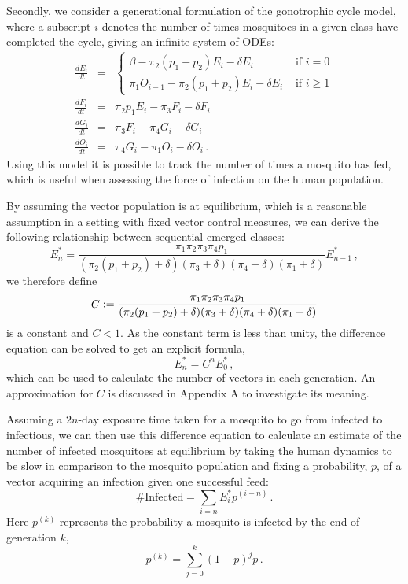 \documentclass[5p,times]{elsarticle}
\newcommand{\defeq}{\vcentcolon=}
\begin{document}
Secondly, we consider a generational formulation of the gonotrophic cycle model, where a subscript $i$ denotes the number of times mosquitoes in a given class have completed the cycle, giving an infinite system of ODEs:
\begin{eqnarray}
\frac{dE_i}{dt} &=& \begin{cases}  \beta - \pi_2(p_1+p_2)E_{i} -\delta E_{i} &\mbox{ if } i=0\\ \pi_1O_{i-1} - \pi_2(p_1+p_2)E_{i} -\delta E_{i} &\mbox{ if } i\geq 1
\end{cases}\\
\frac{dF_i}{dt} &=& \pi_2p_1E_i - \pi_3 F_i - \delta F_i \\
\frac{dG_i}{dt} &=& \pi_3F_i - \pi_4G_i - \delta G_i \\
\frac{dO_i}{dt} &=& \pi_4G_i - \pi_1O_i - \delta O_i \,.
\end{eqnarray}
Using this model it is possible to track the number of times a mosquito has fed, which is useful when assessing the force of infection on the human population.

By assuming the vector population is at equilibrium, which is a reasonable assumption in a setting with fixed vector control measures, we can derive the following relationship between sequential emerged classes:
\begin{equation}
E_n^* = \frac{\pi_1\pi_2\pi_3\pi_4p_1}{(\pi_2(p_1+p_2)+\delta)(\pi_3+\delta)(\pi_4+\delta)(\pi_1+\delta)}E_{n-1}^*\,,
\end{equation}
we therefore define
\begin{equation}
C \defeq \frac{\pi_1\pi_2\pi_3\pi_4p_1}{(\pi_2(p_1+p_2)+\delta)(\pi_3+\delta)(\pi_4+\delta)(\pi_1+\delta)}
\end{equation}
is a constant and $C<1$. As the constant term is less than unity, the difference equation can be solved to get an explicit formula,
\begin{equation}
E_n^* = C^nE_0^*\,,
\end{equation}
which can be used to calculate the number of vectors in each generation. An approximation for $C$ is discussed in Appendix A to investigate its meaning.

Assuming a $2n$-day exposure time taken for a mosquito to go from infected to infectious, we can then use this difference equation to calculate an estimate of the number of infected mosquitoes at equilibrium by taking the human dynamics to be slow in comparison to the mosquito population and fixing a probability, $p$, of a vector acquiring an infection given one successful feed:
\begin{equation}
\mbox{\# Infected} = \sum_{i=n} E_i^* p^{(i-n)}\,.
\label{eqn:numinf}
\end{equation} 
Here $p^{(k)}$ represents the probability a mosquito is infected by the end of generation $k$, 
\begin{equation}
p^{(k)} = \sum_{j=0}^k (1-p)^jp\,.
\label{eqn:p}
\end{equation}
\end{document}
